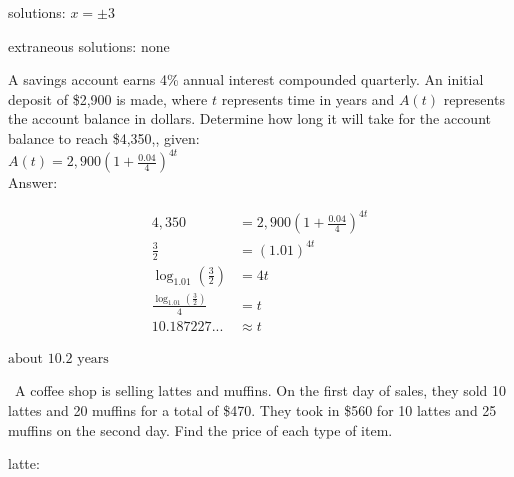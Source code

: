 \documentclass[11pt]{exam}
\begin{document}
\begin{questions}
\begin{solution}
solutions: \(\boxed{ x = \pm 3 }\)

extraneous solutions: \(\boxed{ \text{none} }\)
\end{solution}

\label{exact-endocgextra}
\newpage

\question[5] 
A savings account earns 4\% annual interest compounded quarterly. An initial deposit of \$2,900 is made, where $t$ represents time in years and $A(t)$ represents the account balance in dollars. Determine how long it will take for the account balance to reach \$4,350,, given:\\

 \(\displaystyle{ \displaystyle{A(t) = 2,900 \left( 1 + \frac{0.04}{4} \right)^{4t}} }\) \\

 Answer: \fillin[][2in]
\begin{solution}
\[\begin{aligned} 4,350 &= 2,900 \left( 1 + \frac{0.04}{4} \right)^{4t} \\ \frac{3}{2} &= (1.01)^{4t} \\ \log_{1.01}\left(\frac{3}{2}\right) &= 4t \\ \frac{\log_{1.01}\left(\frac{3}{2}\right)}{4} &= t \\ 10.187227... &\approx t \end{aligned}\]

\(\boxed{\text{about } 10.2 \text{ years}}\)
\end{solution}

\label{exact-endocg}
\newpage

\headerbox{\och}
\label{exact-startoch}

\question[4] \
A coffee shop is selling lattes and muffins. On the first day of sales, they sold 10 lattes and 20 muffins for a total of \$470. They took in \$560 for 10 lattes and 25 muffins on the second day. Find the price of each type of item.\\\vspace{12pt}
    
         latte: \fillin[][2in]\\\vspace{12pt}
        

\end{questions}
\end{document}
